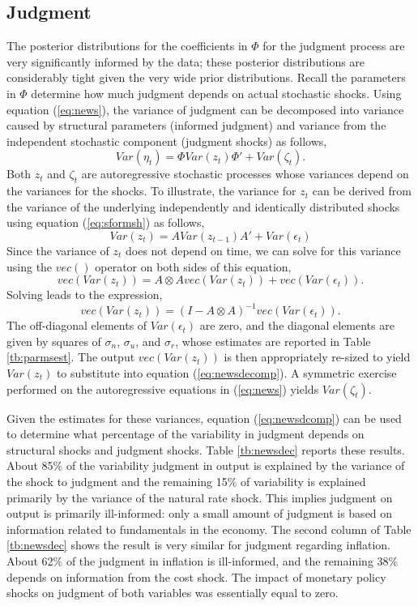 \documentclass[12pt]{article}
\newcommand{\beq}{\begin{equation}}
\newcommand{\eeq}{\end{equation}}
\newcommand{\bdm}{\begin{displaymath}}
\newcommand{\edm}{\end{displaymath}}
\begin{document}
{\subsection{Judgment}
The posterior distributions for the coefficients in $\Phi$ for the judgment process are very significantly informed by the data; these posterior distributions are considerably tight given the very wide prior distributions.  Recall the parameters in $\Phi$ determine how much judgment depends on actual stochastic shocks.  Using equation (\ref{eq:news}), the variance of judgment can be decomposed into variance caused by structural parameters (informed judgment) and variance from the independent stochastic component (judgment shocks) as follows,
\beq \label{eq:newsdecomp} Var(\eta_t) = \Phi Var(z_t) \Phi' + Var(\zeta_t). \eeq
Both $z_t$ and $\zeta_t$ are autoregressive stochastic processes whose variances depend on the variances for the shocks.  To illustrate, the variance for $z_t$ can be derived from the variance of the underlying independently and identically distributed shocks using equation (\ref{eq:sformsh}) as follows,
\bdm Var(z_t) = A Var(z_{t-1}) A' + Var(\epsilon_t) \edm
Since the variance of $z_t$ does not depend on time, we can solve for this variance using the $vec()$ operator on both sides of this equation,
\bdm vec(Var(z_t)) = A \otimes A vec(Var(z_t)) + vec(Var(\epsilon_t)). \edm
Solving leads to the expression,
\beq vec(Var(z_t)) = (I - A \otimes A)^{-1} vec(Var(\epsilon_t)). \eeq
The off-diagonal elements of $Var(\epsilon_t)$ are zero, and the diagonal elements are given by squares of $\sigma_n$, $\sigma_u$, and $\sigma_r$, whose estimates are reported in Table \ref{tb:parmsest}.  The output $vec(Var(z_t))$ is then appropriately re-sized to yield $Var(z_t)$ to substitute into equation (\ref{eq:newsdecomp}).  A symmetric exercise performed on the autoregressive equations in (\ref{eq:news}) yields $Var(\zeta_t)$.  

Given the estimates for these variances, equation (\ref{eq:newsdcomp}) can be used to determine what percentage of the variability in judgment depends on structural shocks and judgment shocks.  Table \ref{tb:newsdec} reports these results.  About 85\% of the variability judgment in output is explained by the variance of the shock to judgment and the remaining 15\% of variability is explained primarily by the variance of the natural rate shock.  This implies judgment on output is primarily ill-informed: only a small amount of judgment is based on information related to fundamentals in the economy.  The second column of Table \ref{tb:newsdec} shows the result is very similar for judgment regarding inflation.  About 62\% of the judgment in inflation is ill-informed, and the remaining 38\% depends on information from the cost shock.  The impact of monetary policy shocks on judgment of both variables was essentially equal to zero.

}
\end{document}
